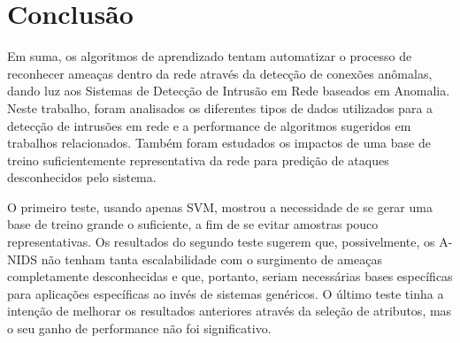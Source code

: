 \chapter{Conclusão}
\label{chap:conclusao}

Em suma, os algoritmos de aprendizado tentam automatizar o processo de reconhecer ameaças dentro da rede
através da detecção de conexões anômalas, dando luz aos Sistemas de Detecção de Intrusão em Rede baseados em Anomalia.
Neste trabalho, foram analisados os diferentes tipos de dados utilizados para a detecção de intrusões em rede e a
performance de algoritmos sugeridos em trabalhos relacionados. Também foram estudados os impactos de uma base de
treino suficientemente representativa da rede para predição de ataques desconhecidos pelo sistema.
\par O primeiro teste, usando apenas SVM, mostrou a necessidade de se gerar uma base de treino grande o suficiente, a
fim de se evitar amostras pouco representativas. Os resultados do segundo teste sugerem que, possivelmente, os A-NIDS
não tenham tanta escalabilidade com o surgimento de ameaças completamente desconhecidas e que, portanto, seriam
necessárias bases específicas para aplicações específicas ao invés de sistemas genéricos. O último teste tinha a
intenção de melhorar os resultados anteriores através da seleção de atributos, mas o seu ganho de performance não foi
significativo.
